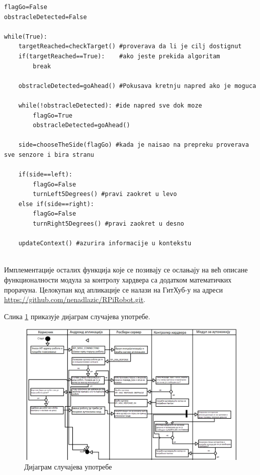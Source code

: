 \documentclass[12pt,oneside]{memoir}
\theoremstyle{remark}
\begin{document}
\begin{lstlisting}
flagGo=False
obstracleDetected=False

while(True):
	targetReached=checkTarget() #proverava da li je cilj dostignut
	if(targetReached==True):	#ako jeste prekida algoritam
		break

	obstracleDetected=goAhead()	#Pokusava kretnju napred ako je moguca

	while(!obstracleDetected): #ide napred sve dok moze
		flagGo=True
		obstracleDetected=goAhead()

	side=chooseTheSide(flagGo) #kada je naisao na prepreku proverava sve senzore i bira stranu

	if(side==left):
		flagGo=False
		turnLeft5Degrees() #pravi zaokret u levo 
	else if(side==right):
		flagGo=False
		turnRight5Degrees() #pravi zaokret u desno
	
	updateContext() #azurira informacije u kontekstu
	
\end{lstlisting}

Имплементације осталих функција које се позивају се ослањају на већ описане функционалности модула за контролу хардвера са додатком математичких прорачуна. Целокупан код апликације се налази на ГитХуб-у на адреси \url{https://github.com/nenadlazic/RPiRobot.git}.


Слика \ref{fig:dijagramklasaapp} приказује дијаграм случајева употребе.

\begin{figure}[!ht]
\centering
\includegraphics[width=1.0\textwidth]{slike/aktvivnostidijagram.png}
\caption{Дијаграм случајева употребе }
\label{fig:dijagramklasaapp}
\end{figure}
\end{document}
